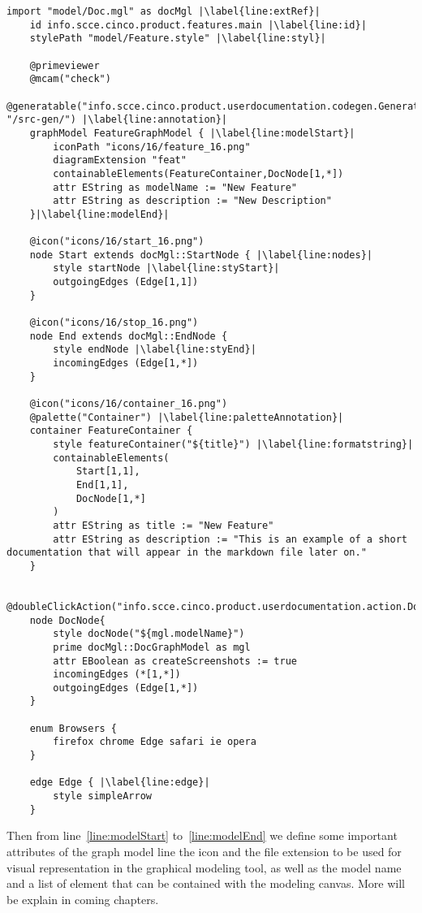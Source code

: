 \begin{lstlisting}[language=MGL, caption={Doc.mgl for the user sequence graph model}, label=docMGL, escapechar=|, name=DocMGL]
    import "model/Doc.mgl" as docMgl |\label{line:extRef}|
    id info.scce.cinco.product.features.main |\label{line:id}|
    stylePath "model/Feature.style" |\label{line:styl}|

    @primeviewer
    @mcam("check")
    @generatable("info.scce.cinco.product.userdocumentation.codegen.Generate", "/src-gen/") |\label{line:annotation}|
    graphModel FeatureGraphModel { |\label{line:modelStart}|
        iconPath "icons/16/feature_16.png"
        diagramExtension "feat"
        containableElements(FeatureContainer,DocNode[1,*])
        attr EString as modelName := "New Feature"
        attr EString as description := "New Description"
    }|\label{line:modelEnd}|

    @icon("icons/16/start_16.png")
    node Start extends docMgl::StartNode { |\label{line:nodes}|
        style startNode |\label{line:styStart}|
        outgoingEdges (Edge[1,1])
    }

    @icon("icons/16/stop_16.png")
    node End extends docMgl::EndNode {
        style endNode |\label{line:styEnd}|
        incomingEdges (Edge[1,*])
    }

    @icon("icons/16/container_16.png")
    @palette("Container") |\label{line:paletteAnnotation}|
    container FeatureContainer {
        style featureContainer("${title}") |\label{line:formatstring}|
        containableElements(
            Start[1,1],
            End[1,1],
            DocNode[1,*]
        )
        attr EString as title := "New Feature"
        attr EString as description := "This is an example of a short documentation that will appear in the markdown file later on."
    }
    
    @doubleClickAction("info.scce.cinco.product.userdocumentation.action.DocNodeOpenSubmodel")
    node DocNode{
        style docNode("${mgl.modelName}")
        prime docMgl::DocGraphModel as mgl
        attr EBoolean as createScreenshots := true
        incomingEdges (*[1,*])
        outgoingEdges (Edge[1,*])
    }

    enum Browsers {
        firefox chrome Edge safari ie opera
    }

    edge Edge { |\label{line:edge}|
        style simpleArrow
    }
\end{lstlisting}

Then from line~\ref{line:modelStart} to~\ref{line:modelEnd} we define some important attributes of the graph model line the icon and the file extension to be used for visual representation in the graphical modeling tool, as well as the model name and a list of element that can be contained with the modeling canvas. More will be explain in coming chapters.


